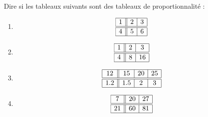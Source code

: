 
\begin{exercice}\label{exo2smath-0112}

    Dire si les tableaux suivants sont des tableaux de proportionnalité :
    \begin{multicols}{2}
    \begin{enumerate}
        \item
            \begin{equation*}
                \begin{array}[]{|c||c|c|}
                    \hline
                    1&2&3\\
                    \hline\hline
                    4&5&6\\
                    \hline
                \end{array}
            \end{equation*}
        \item
            \begin{equation*}
                \begin{array}[]{|c||c|c|}
                    \hline
                    1&2&3\\
                    \hline\hline
                    4&8&16\\
                    \hline
                \end{array}
            \end{equation*}
        \item
            \begin{equation*}
                \begin{array}[]{|c||c|c|c|}
                    \hline
                     12&15&20&25\\
                      \hline\hline
                      1.2&1.5&2&3\\ 
                      \hline 
                       \end{array}
                   \end{equation*}
               \item
                   \begin{equation*}
                       \begin{array}[]{|c||c|c|}
                           \hline
                           7&20&27\\
                           \hline\hline
                           21&60&81\\
                           \hline
                       \end{array}
                   \end{equation*}
    \end{enumerate}
    \end{multicols}

\end{exercice}
